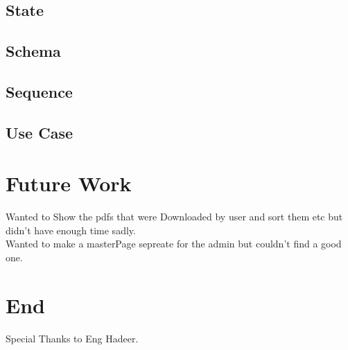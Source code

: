 \documentclass[a4paper,ft=14pt]{article}
\begin{document}
\subsection{State}
\noindent{}
\subsection{Schema}
\noindent{}
\subsection{Sequence}
\noindent{}
\subsection{Use Case}
\noindent{}

\section{Future Work}
Wanted to Show the pdfs that were Downloaded by user and sort them etc but didn't have enough time sadly.\\
Wanted to make a masterPage sepreate for the admin but couldn't find  a good one.\\

\section*{End}

Special Thanks to Eng Hadeer.
\end{document}

